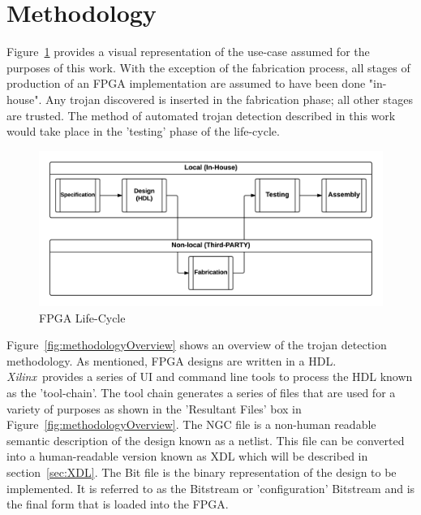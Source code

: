 \documentclass[conference]{IEEEtran}
\newcommand{\Xilinx}{\textit{\gls{Xilinx}}~}
\begin{document}
\section{Methodology}
Figure~\ref{fig:Concept} provides a visual representation of the use-case assumed for the purposes of this work. 
With the exception of the fabrication process, all stages of production of an \acrshort{FPGA} implementation are assumed to have been done "in-house". 
Any trojan discovered is inserted in the fabrication phase; all other stages are trusted.  
The method of automated trojan detection described in this work would take place in the 'testing' phase of the life-cycle. 
\begin{figure}[h]
	\centering
	\includegraphics[width=1\linewidth]{../Thesis/Figures/Concept}
	\caption[FPGA Life-Cycle]{FPGA Life-Cycle}
	\label{fig:Concept}
\end{figure}
Figure~\ref{fig:methodologyOverview} shows an overview of the trojan detection methodology.
As mentioned, \acrshort{FPGA} designs are written in a \acrfull{HDL}.
\Xilinx provides a series of \acrfull{UI} and command line tools to process the \acrshort{HDL} known as the 'tool-chain'.
The tool chain generates a series of files that are used for a variety of purposes as shown in the 'Resultant Files' box in Figure~\ref{fig:methodologyOverview}.
The NGC file is a non-human readable semantic description of the design known as a netlist.
This file can be converted into a human-readable version known as \acrfull{XDL} which will be described in section~\ref{sec:XDL}.
The Bit file is the binary representation of the design to be implemented.
It is referred to as the \gls{Bitstream} or 'configuration' \gls{Bitstream} and is the final form that is loaded into the \acrshort{FPGA}.
\end{document}
